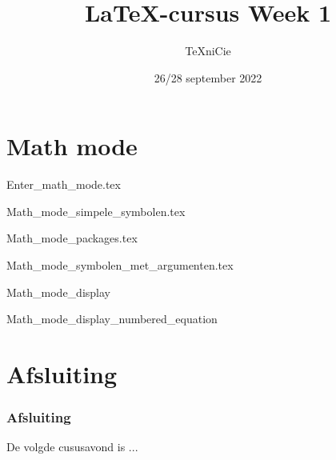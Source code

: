 \documentclass[allauthors,dutch]{../../cursuspresentatie}
\title{\LaTeX{}-cursus Week 1}
\author{\TeX niCie}
\date{26/28 september 2022}
\def\importslide#1#2{%
	{#2}
}
\begin{document}
\section{Math mode}

\importslide{2025-eerstejaars_cursus_1}{Enter_math_mode.tex}
\importslide{2025-eerstejaars_cursus_1}{Math_mode_simpele_symbolen.tex}
\importslide{2025-eerstejaars_cursus_1}{Math_mode_packages.tex}
\importslide{2025-eerstejaars_cursus_1}{Math_mode_symbolen_met_argumenten.tex}
\importslide{2025-eerstejaars_cursus_1}{Math_mode_display}
\importslide{2025-eerstejaars_cursus_1}{Math_mode_display_numbered_equation}

\section{Afsluiting}
\begin{frame}
	\frametitle{Afsluiting}
	
	De volgde cususavond is ...
\end{frame}
	
\end{document}
